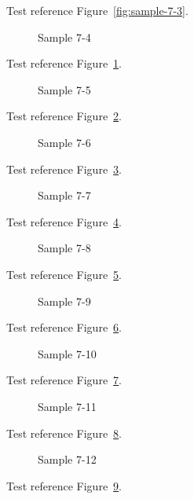 Test reference Figure~\ref{fig:sample-7-3}.

\begin{figure}[tbhp]
\caption{Sample 7-4}
\label{fig:sample-7-4}
\end{figure}

Test reference Figure~\ref{fig:sample-7-4}.

\begin{figure}[tbhp]
\caption{Sample 7-5}
\label{fig:sample-7-5}
\end{figure}

Test reference Figure~\ref{fig:sample-7-5}.

\begin{figure}[tbhp]
\caption{Sample 7-6}
\label{fig:sample-7-6}
\end{figure}

Test reference Figure~\ref{fig:sample-7-6}.

\begin{figure}[tbhp]
\caption{Sample 7-7}
\label{fig:sample-7-7}
\end{figure}

Test reference Figure~\ref{fig:sample-7-7}.

\begin{figure}[tbhp]
\caption{Sample 7-8}
\label{fig:sample-7-8}
\end{figure}

Test reference Figure~\ref{fig:sample-7-8}.

\begin{figure}[tbhp]
\caption{Sample 7-9}
\label{fig:sample-7-9}
\end{figure}

Test reference Figure~\ref{fig:sample-7-9}.

\begin{figure}[tbhp]
\caption{Sample 7-10}
\label{fig:sample-7-10}
\end{figure}

Test reference Figure~\ref{fig:sample-7-10}.

\begin{figure}[tbhp]
\caption{Sample 7-11}
\label{fig:sample-7-11}
\end{figure}

Test reference Figure~\ref{fig:sample-7-11}.

\begin{figure}[tbhp]
\caption{Sample 7-12}
\label{fig:sample-7-12}
\end{figure}

Test reference Figure~\ref{fig:sample-7-12}.

